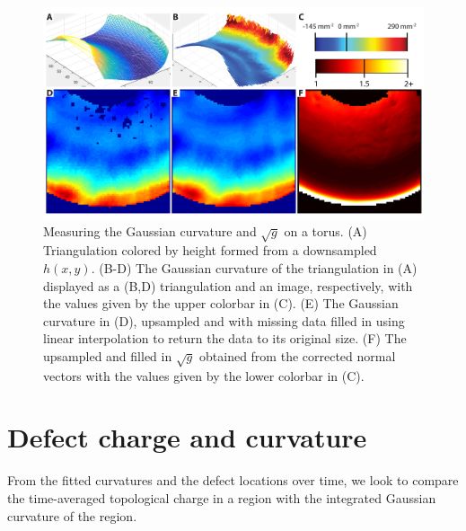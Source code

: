 \begin{figure}
  \centering
  \includegraphics{figures/C3/Ch3-Figs_CurvFitTorus.png}
  \caption{Measuring the Gaussian curvature and $\sqrt{g}$ on a torus.
  (A) Triangulation colored by height formed from a downsampled $h(x,y)$.
  (B-D) The Gaussian curvature of the triangulation in (A) displayed as a (B,D) triangulation and an image, respectively, with the values given by the upper colorbar in (C).
  (E) The Gaussian curvature in (D), upsampled and with missing data filled in using linear interpolation to return the data to its original size.
  (F) The upsampled and filled in $\sqrt{g}$ obtained from the corrected normal vectors with the values given by the lower colorbar in (C).}\label{f:3-CurvFitTorus}
\end{figure}




\section{Defect charge and curvature}
From the fitted curvatures and the defect locations over time, we look to compare the time-averaged topological charge in a region with the integrated Gaussian curvature of the region.


